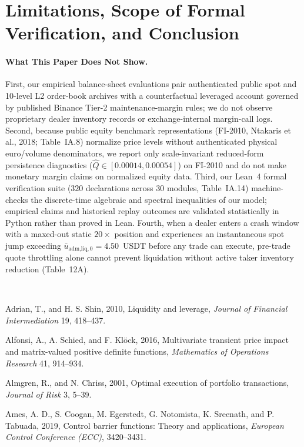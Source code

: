 \documentclass[11pt]{article}
\theoremstyle{remark}
\begin{document}
\section{Limitations, Scope of Formal Verification, and Conclusion}
\paragraph{What This Paper Does Not Show.}
First, our empirical balance-sheet evaluations pair authenticated public spot and 10-level L2 order-book archives with a counterfactual leveraged account governed by published Binance Tier-2 maintenance-margin rules; we do not observe proprietary dealer inventory records or exchange-internal margin-call logs. Second, because public equity benchmark representations (FI-2010, Ntakaris et al., 2018; Table~IA.8) normalize price levels without authenticated physical euro/volume denominators, we report only scale-invariant reduced-form persistence diagnostics ($\hat{Q} \in [0.00014, 0.00054]$) on FI-2010 and do not make monetary margin claims on normalized equity data. Third, our Lean~4 formal verification suite ($320$ declarations across $30$ modules, Table~IA.14) machine-checks the discrete-time algebraic and spectral inequalities of our model; empirical claims and historical replay outcomes are validated statistically in Python rather than proved in Lean. Fourth, when a dealer enters a crash window with a maxed-out static $20\times$ position and experiences an instantaneous spot jump exceeding $\bar{u}_{\text{adm,liq},0} = 4.50$~USDT before any trade can execute, pre-trade quote throttling alone cannot prevent liquidation without active taker inventory reduction (Table~12A).

\vspace{0.18cm}
\\[0.10cm]
\footnotesize
\setlength{\parskip}{0.08cm}
\setlength{\parindent}{-0.4cm}
\leftskip=0.4cm

Adrian, T., and H. S. Shin, 2010, Liquidity and leverage, \emph{Journal of Financial Intermediation} 19, 418--437.

Alfonsi, A., A. Schied, and F. Kl\"ock, 2016, Multivariate transient price impact and matrix-valued positive definite functions, \emph{Mathematics of Operations Research} 41, 914--934.

Almgren, R., and N. Chriss, 2001, Optimal execution of portfolio transactions, \emph{Journal of Risk} 3, 5--39.

Ames, A. D., S. Coogan, M. Egerstedt, G. Notomista, K. Sreenath, and P. Tabuada, 2019, Control barrier functions: Theory and applications, \emph{European Control Conference (ECC)}, 3420--3431.
\end{document}
